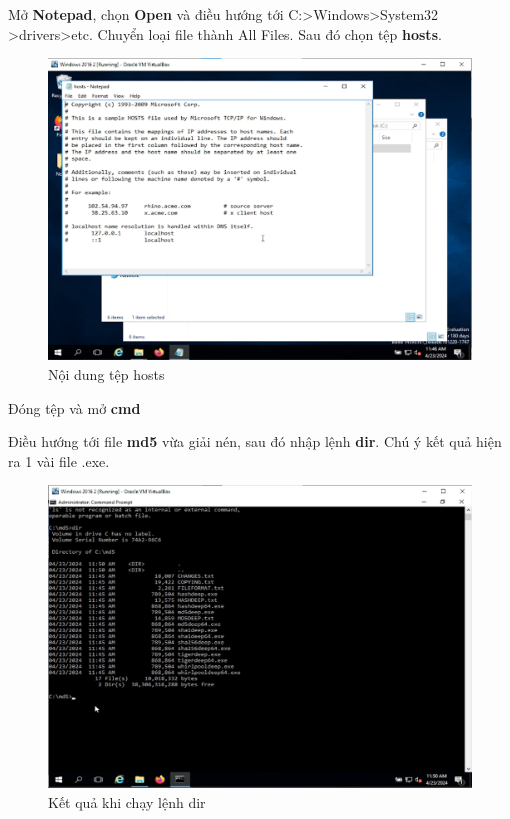  Mở \textbf{Notepad}, chọn \textbf{Open} và điều hướng tới C:>Windows>System32\\>drivers>etc. Chuyển loại file thành All Files. Sau đó chọn tệp \textbf{hosts}.

\begin{figure}[!htb]
    \centering
    \includegraphics[width=0.8\linewidth]{figure//chapter9//lab9_1/hosts_file.png}
    \caption{Nội dung tệp hosts}
    \label{fig:enter-label}
\end{figure}

 Đóng tệp và mở \textbf{cmd}

 Điều hướng tới file \textbf{md5} vừa giải nén, sau đó nhập lệnh \textbf{dir}. Chú ý kết quả hiện ra 1 vài file .exe.

\begin{figure}[!htb]
    \centering
    \includegraphics[width=0.85\linewidth]{figure//chapter9//lab9_1/dir_result.png}
    \caption{Kết quả khi chạy lệnh dir}
    \label{fig:enter-label}
\end{figure}

